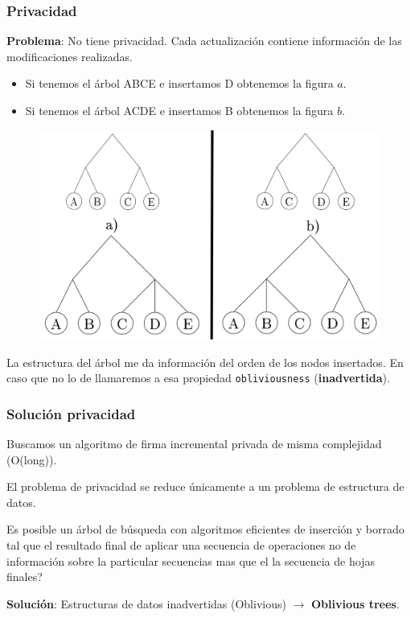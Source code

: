 \documentclass[10pt]{beamer}
\begin{document}


\begin{frame}
\frametitle{Privacidad}
\textbf{Problema}: No tiene privacidad. Cada actualización contiene información de las
modificaciones realizadas.
\vspace{-0.2cm}
\begin{itemize}\itemsep-1em
  \item Si tenemos el árbol ABCE e insertamos D obtenemos la figura $a$.
  \item Si tenemos el árbol ACDE e insertamos B obtenemos la figura $b$.
\end{itemize}

\begin{figure}[h!]
    \centering
    \includegraphics[scale=0.20]{2-3tree.jpg}
\end{figure}

\pause
La estructura del árbol me da información del orden de los nodos insertados.
En caso que no lo de llamaremos a esa propiedad \texttt{obliviousness} (\textbf{inadvertida}).

\end{frame}

\begin{frame}
\frametitle{Solución privacidad}

Buscamos un algoritmo de firma incremental privada de misma complejidad (O(long)).

El problema de privacidad se reduce únicamente a un problema de estructura de datos.

\pause
Es posible un árbol de búsqueda con algoritmos eficientes de inserción y borrado tal que el
resultado final de aplicar una secuencia de operaciones no de información sobre la particular
secuencias mas que el la secuencia de hojas finales?

\pause
\textbf{Solución}: Estructuras de datos inadvertidas (Oblivious) $\to$ \textbf{Oblivious trees}.

\end{frame}
\end{document}
